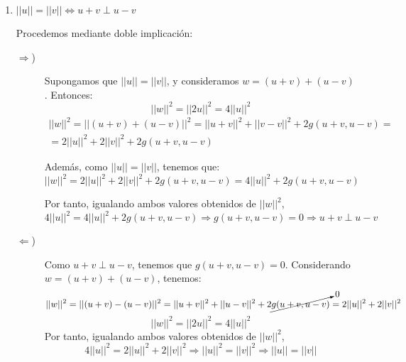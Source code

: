 \begin{ejercicio}
\begin{enumerate}
\begin{description}
        \end{description}

        \item $||u||=||v|| \Longleftrightarrow u+v \perp u-v$

        Procedemos mediante doble implicación:
        \begin{description}
            \item [$\Longrightarrow$)] Supongamos que $||u||=||v||$, y consideramos $w=(u+v)+(u-v)$. Entonces:
            \begin{equation*}
                ||w||^2 = ||2u||^2 = 4||u||^2
            \end{equation*}
            \begin{multline*}
                ||w||^2 = ||(u+v)+(u-v)||^2 = ||u+v||^2 + ||v-v||^2 +2 g(u+v,u-v) =\\=
                2||u||^2 + 2||v||^2 +2 g(u+v,u-v)
            \end{multline*}

            Además, como $||u||=||v||$, tenemos que:
            \begin{equation*}
                ||w||^2 = 2||u||^2 + 2||v||^2 +2g(u+v, u-v) = 4||u||^2 +2g(u+v, u-v)
            \end{equation*}

            Por tanto, igualando ambos valores obtenidos de $||w||^2$,
            \begin{equation*}
                4||u||^2 = 4||u||^2 +2g(u+v, u-v) \Longrightarrow g(u+v, u-v)=0 \Longrightarrow u+v\perp u-v
            \end{equation*}

            \item [$\Longleftarrow$)] Como $u+v\perp u-v$, tenemos que $g(u+v,u-v)=0$. Considerando $w=(u+v)+(u-v)$, tenemos:
            \begin{equation*}
                ||w||^2 = ||(u+v)-(u-v)||^2 = ||u+v||^2 + ||u-v||^2 +2\cancelto{0}{g(u+v, u-v)} = 2||u||^2 + 2||v||^2
            \end{equation*}
            \begin{equation*}
                ||w||^2 = ||2u||^2 = 4||u||^2
            \end{equation*}
            Por tanto, igualando ambos valores obtenidos de $||w||^2$,
            \begin{equation*}
                4||u||^2 = 2||u||^2 + 2||v||^2  \Longrightarrow ||u||^2 = ||v||^2 \Longrightarrow ||u|| = ||v||
            \end{equation*}
        \end{description}


\end{enumerate}
\end{ejercicio}
